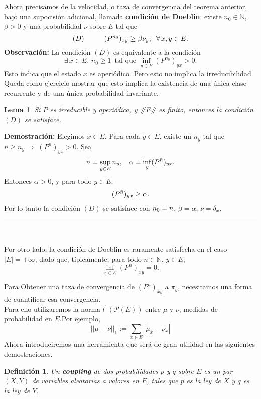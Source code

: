 \documentclass[a4paper]{article}
\newtheorem{definicion}{Definición}
\newtheorem{lem}{Lema}
\numberwithin{equation}{subsection}
\def\N{\mathbb N}
\begin{document}
Ahora precisamos de la velocidad, o taza de convergencia del teorema anterior, bajo una supocisión adicional, llamada \textbf{condición de Doeblin}: existe $n_0\in \N$, $\beta>0$ y una probabilidad $\nu$ sobre $E$ tal que
\[(D)\hspace{1cm}(P^{n_0})_{xy}\geq \beta\nu_y,\hspace{0.2cm}\forall\,x,y\in E.\]
\textbf{Observación:} La condición $(D)$ es equivalente a la condición
\[\exists\,x\in E,\,n_0\geq 1\,\text{ tal que }\inf_{y\in E}(P^{n_0})_{yx} > 0.\]
Esto indica que el estado $x$ es aperiódico. Pero esto no implica la irreducibilidad. Queda como ejercicio mostrar que esto implica la existencia de una única clase recurrente y de una única probabilidad invariante.

\begin{lem}
Si $P$ es irreducible y aperiódica, y #E# es finito, entonces la condición $(D)$ se satisface.
\end{lem}

\textbf{Demostración: }Elegimos $x\in E$. Para cada $y\in E$, existe un $n_y$ tal que $n\geq n_y\,\Longrightarrow\, (P^n)_{yx}>0$. Sea
\[\Bar{n} = \sup_{y\in E}n_y,\hspace{0.3cm}\alpha = \inf_y (P^{\Bar{n}})_{yx}.\]
Entonces $\alpha >0$, y para todo $y\in E$,
\[(P^{\Bar{n}})_{yx}\geq \alpha.\]
Por lo tanto la condición $(D)$ se satisface con $n_0 = \Bar{n}$, $\beta=\alpha$, $\nu = \delta_x$.\\
\rule{0.7em}{0.7em}\\ \newline

Por otro lado, la condición de Doeblin es raramente satisfecha en el caso $|E| = +\infty$, dado que, típicamente, para todo $n\in \N$, $y\in E$,
\[\inf_{x\in E}(P^n)_{xy} = 0.\]

Para Obtener una taza de convergencia de $(P^n)_{xy}$ a $\pi_y$, necesitamos una forma de cuantificar esa convergencia.\\ Para ello utilizaremos la norma $l^1(\mathcal{P}(E))$ entre $\mu$ y $\nu$, medidas de probabilidad en $E$.\newline Por ejemplo,
\[||\mu-\nu ||_1 := \sum_{x\in E}|\mu_x - \nu_x|\]
Ahora introduciremos una herramienta que será de gran utilidad en las siguientes demostraciones.
\begin{definicion}
Un \textbf{coupling} de dos probabilidades $p$ y $q$ sobre $E$ es un par $(X,Y)$ de variables aleatorias a valores en $E$, tales que $p$ es la ley de $X$ y $q$ es la ley de $Y$.
\end{definicion}
\end{document}
